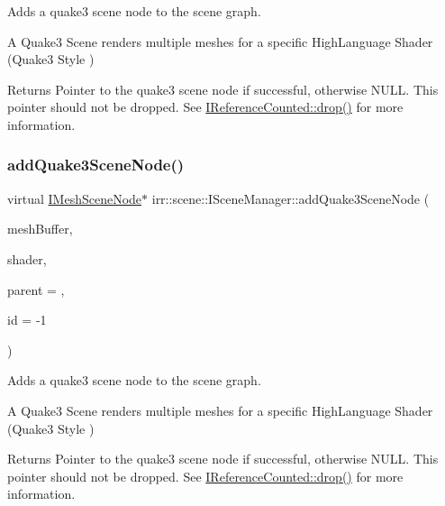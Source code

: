 Adds a quake3 scene node to the scene graph. 

A Quake3 Scene renders multiple meshes for a specific High\+Language Shader (Quake3 Style ) \begin{DoxyReturn}{Returns}
Pointer to the quake3 scene node if successful, otherwise N\+U\+LL. This pointer should not be dropped. See \hyperlink{classirr_1_1IReferenceCounted_a03856a09355b89d178090c4a5f738543}{I\+Reference\+Counted\+::drop()} for more information. 
\end{DoxyReturn}
\mbox{\label{classirr_1_1scene_1_1ISceneManager_a58642d304110532988d27cebbe76ed41}} 
\subsubsection{\texorpdfstring{add\+Quake3\+Scene\+Node()}{addQuake3SceneNode()}\hspace{0.1cm}{\footnotesize\ttfamily [2/2]}}
{\footnotesize\ttfamily virtual \hyperlink{classirr_1_1scene_1_1IMeshSceneNode}{I\+Mesh\+Scene\+Node}$\ast$ irr\+::scene\+::\+I\+Scene\+Manager\+::add\+Quake3\+Scene\+Node (\begin{DoxyParamCaption}\item[{const \hyperlink{classirr_1_1scene_1_1IMeshBuffer}{I\+Mesh\+Buffer} $\ast$}]{mesh\+Buffer,  }\item[{const \hyperlink{structirr_1_1scene_1_1quake3_1_1IShader}{quake3\+::\+I\+Shader} $\ast$}]{shader,  }\item[{\hyperlink{classirr_1_1scene_1_1ISceneNode}{I\+Scene\+Node} $\ast$}]{parent = {},  }\item[{\hyperlink{namespaceirr_ac66849b7a6ed16e30ebede579f9b47c6}{s32}}]{id = {\ttfamily -\/1} }\end{DoxyParamCaption})\hspace{0.3cm}{\ttfamily [pure virtual]}}



Adds a quake3 scene node to the scene graph. 

A Quake3 Scene renders multiple meshes for a specific High\+Language Shader (Quake3 Style ) \begin{DoxyReturn}{Returns}
Pointer to the quake3 scene node if successful, otherwise N\+U\+LL. This pointer should not be dropped. See \hyperlink{classirr_1_1IReferenceCounted_a03856a09355b89d178090c4a5f738543}{I\+Reference\+Counted\+::drop()} for more information. 
\end{DoxyReturn}
\mbox{\label{classirr_1_1scene_1_1ISceneManager_a22ea17e8c06a773af9828f7bb70cdc40}} 
